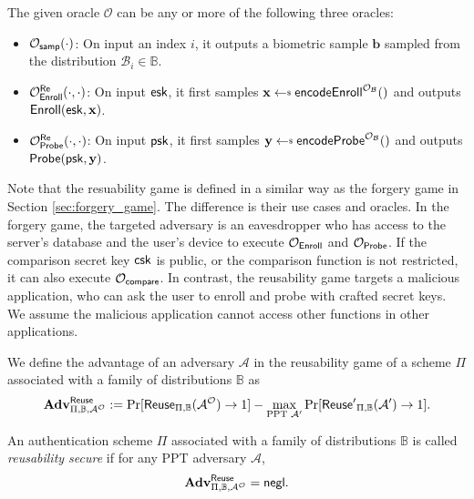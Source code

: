 The given oracle $\mathcal{O}$ can be any or more of the following three oracles:

\begin{itemize}
	\item $\mathcal{O}_{\sf samp}(\cdot)$: On input an index $i$, it outputs a biometric sample $\mathbf{b}$ sampled from the distribution $\mathcal{B}_i \in \mathbb{B}$.

	\item $\mathcal{O}_{\sf Enroll}^{ {\sf Re}} (\cdot, \cdot)$: On input ${\sf esk}$, it first samples $\mathbf{x} \getsdollar {\sf encodeEnroll}^{\mathcal{O}_{\mathcal{B}}}()$ and outputs ${\sf Enroll}({\sf esk}, \mathbf{x})$.
	
	\item $\mathcal{O}_{\sf Probe}^{ {\sf Re}} (\cdot, \cdot)$: On input ${\sf psk}$, it first samples $\mathbf{y} \getsdollar {\sf encodeProbe}^{\mathcal{O}_{\mathcal{B}}}()$ and outputs ${\sf Probe}({\sf psk}, \mathbf{y})$.

\end{itemize}

Note that the resuability game is defined in a similar way as the forgery game in Section \ref{sec:forgery_game}. The difference is their use cases and oracles. In the forgery game, the targeted adversary is an eavesdropper who has access to the server's database and the user's device to execute $\mathcal{O}_{\sf Enroll}$ and $\mathcal{O}_{\sf Probe}$. If the comparison secret key ${\sf csk}$ is public, or the comparison function is not restricted, it can also execute $\mathcal{O}_{\sf compare}$. In contrast, the reusability game targets a malicious application, who can ask the user to enroll and probe with crafted secret keys. We assume the malicious application cannot access other functions in other applications.

We define the advantage of an adversary $\mathcal{A}$ in the reusability game of a scheme $\Pi$ associated with a family of distributions $\mathbb{B}$ as
\[
	\mathbf{Adv}^{\sf Reuse}_{\Pi, \mathbb{B}, \mathcal{A}^\mathcal{O}} := \Pr[{\sf Reuse}_{\Pi, \mathbb{B}}(\mathcal{A}^\mathcal{O}) \to 1] -
	\max_{\text{PPT } \mathcal{A}'} \Pr[{\sf Reuse'}_{\Pi, \mathbb{B}}(\mathcal{A}') \to 1].
\]

An authentication scheme $\Pi$ associated with a family of distributions $\mathbb{B}$ is called \emph{reusability secure} if for any PPT adversary $\mathcal{A}$,
\[
	\mathbf{Adv}^{\sf Reuse}_{\Pi, \mathbb{B}, \mathcal{A^\mathcal{O}}} = \mathsf{negl}.
\]



